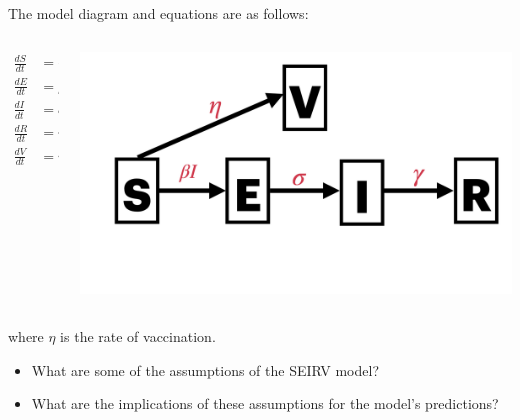 \documentclass[
  ignorenonframetext,
]{beamer}
\begin{document}
\begin{frame}
The model diagram and equations are as follows:

\begin{columns}[T]
\begin{column}{0.4\textwidth}
\begin{align}
\frac{dS}{dt} & = -\beta S I - \eta S \\
\frac{dE}{dt} & = \beta S I - \sigma E \\
\frac{dI}{dt} & = \sigma E - \gamma I \\
\frac{dR}{dt} & = \gamma I \\
\frac{dV}{dt} & = \eta S
\end{align}
\end{column}

\begin{column}{0.6\textwidth}
\includegraphics{images/model_diagrams/model_diagrams.010.jpeg}
\end{column}
\end{columns}

where \(\eta\) is the rate of vaccination.
\end{frame}

\begin{frame}
\begin{tcolorbox}[enhanced jigsaw, toprule=.15mm, opacityback=0, bottomtitle=1mm, opacitybacktitle=0.6, colframe=quarto-callout-caution-color-frame, titlerule=0mm, breakable, colback=white, title={Discussion}, left=2mm, colbacktitle=quarto-callout-caution-color!10!white, arc=.35mm, coltitle=black, bottomrule=.15mm, rightrule=.15mm, leftrule=.75mm, toptitle=1mm]

\begin{itemize}
\item
  What are some of the assumptions of the SEIRV model?
\item
  What are the implications of these assumptions for the model's
  predictions?
\end{itemize}

\end{tcolorbox}
\end{frame}
\end{document}
